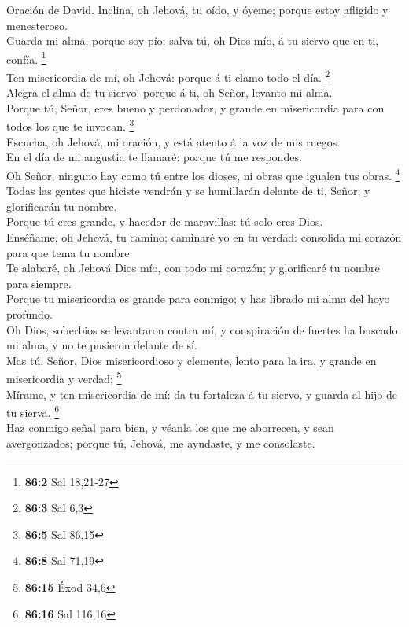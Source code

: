  Oración de David. Inclina, oh Jehová, tu oído, y óyeme;
porque estoy afligido y menesteroso.\\
 Guarda mi alma, porque soy pío: salva tú, oh Dios mío, á
tu siervo que en ti, confía. \footnote{\textbf{86:2} Sal 18,21-27}\\
 Ten misericordia de mí, oh Jehová: porque á ti clamo todo
el día. \footnote{\textbf{86:3} Sal 6,3}\\
 Alegra el alma de tu siervo: porque á ti, oh Señor,
levanto mi alma.\\
 Porque tú, Señor, eres bueno y perdonador, y grande en
misericordia para con todos los que te invocan. \footnote{\textbf{86:5}
  Sal 86,15}\\
 Escucha, oh Jehová, mi oración, y está atento á la voz de
mis ruegos.\\
 En el día de mi angustia te llamaré: porque tú me
respondes.\\
 Oh Señor, ninguno hay como tú entre los dioses, ni obras
que igualen tus obras. \footnote{\textbf{86:8} Sal 71,19}\\
 Todas las gentes que hiciste vendrán y se humillarán
delante de ti, Señor; y glorificarán tu nombre.\\
 Porque tú eres grande, y hacedor de maravillas: tú solo
eres Dios.\\
 Enséñame, oh Jehová, tu camino; caminaré yo en tu
verdad: consolida mi corazón para que tema tu nombre.\\
 Te alabaré, oh Jehová Dios mío, con todo mi corazón; y
glorificaré tu nombre para siempre.\\
 Porque tu misericordia es grande para conmigo; y has
librado mi alma del hoyo profundo.\\
 Oh Dios, soberbios se levantaron contra mí, y
conspiración de fuertes ha buscado mi alma, y no te pusieron delante de
sí.\\
 Mas tú, Señor, Dios misericordioso y clemente, lento
para la ira, y grande en misericordia y verdad; \footnote{\textbf{86:15}
  Éxod 34,6}\\
 Mírame, y ten misericordia de mí: da tu fortaleza á tu
siervo, y guarda al hijo de tu sierva. \footnote{\textbf{86:16} Sal
  116,16}\\
 Haz conmigo señal para bien, y véanla los que me
aborrecen, y sean avergonzados; porque tú, Jehová, me ayudaste, y me
consolaste.

